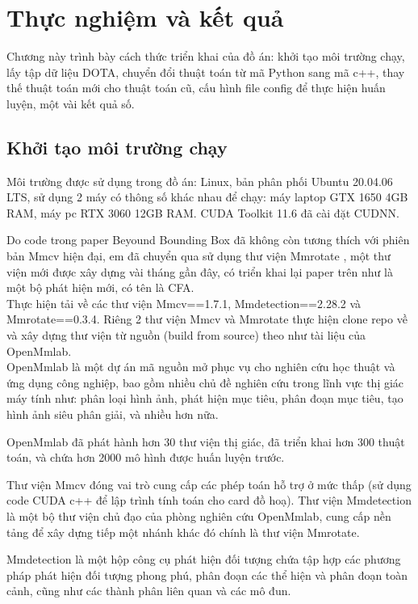 \documentclass[12pt,a4paper,openany,oneside]{report}
\begin{document}
\chapter{Thực nghiệm và kết quả}

Chương này trình bày cách thức triển khai của đồ án: khởi tạo môi trường chạy, lấy tập dữ liệu DOTA, chuyển đổi thuật toán từ mã Python sang mã c++, thay thế thuật toán mới cho thuật toán cũ, cấu hình file config để thực hiện huấn luyện, một vài kết quả số.
\section{Khởi tạo môi trường chạy} 

Môi trường được sử dụng trong đồ án: Linux, bản phân phối Ubuntu 20.04.06 LTS, sử dụng 2 máy có thông số khác nhau để chạy: máy laptop GTX 1650 4GB RAM, máy pc RTX 3060 12GB RAM. CUDA Toolkit 11.6 đã cài đặt CUDNN.

Do code trong paper Beyound Bounding Box đã không còn tương thích với phiên bản Mmcv \cite{mmcv} hiện đại, em đã chuyển qua sử dụng thư viện Mmrotate \cite{zhou2022mmrotate}, một thư viện mới được xây dựng vài tháng gần đây, có triển khai lại paper trên như là một bộ phát hiện mới, có tên là CFA.\\
 Thực hiện tải về các thư viện Mmcv==1.7.1, Mmdetection==2.28.2 và Mmrotate==0.3.4. Riêng 2 thư viện Mmcv và Mmrotate thực hiện clone repo về và xây dựng thư viện từ nguồn (build from source) theo như tài liệu của OpenMmlab.\\

OpenMmlab là một dự án mã nguồn mở phục vụ cho nghiên cứu học thuật và ứng dụng công nghiệp, bao gồm nhiều chủ đề nghiên cứu trong lĩnh vực thị giác máy tính như: phân loại hình ảnh, phát hiện mục tiêu, phân đoạn mục tiêu, tạo hình ảnh siêu phân giải, và nhiều hơn nữa.

OpenMmlab đã phát hành hơn 30 thư viện thị giác, đã triển khai hơn 300 thuật toán, và chứa hơn 2000 mô hình được huấn luyện trước.

Thư viện Mmcv đóng vai trò cung cấp các phép toán hỗ trợ ở mức thấp (sử dụng code CUDA c++ để lập trình tính toán cho card đồ hoạ). Thư viện Mmdetection \cite{mmdetection} là một bộ thư viện chủ đạo của phòng nghiên cứu OpenMmlab, cung cấp nền tảng để xây dựng tiếp một nhánh khác đó chính là thư viện Mmrotate. 

Mmdetection là một hộp công cụ phát hiện đối tượng chứa tập hợp các phương pháp phát hiện đối tượng phong phú, phân đoạn các thể hiện và phân đoạn toàn cảnh, cũng như các thành phân liên quan và các mô đun.
\end{document}
